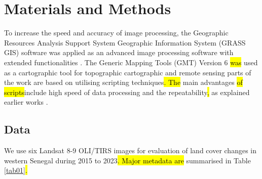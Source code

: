 \documentclass[earth,article,submit,pdftex,moreauthors]{Definitions/mdpi}
\begin{document}
\section{Materials and Methods}

To increase the speed and accuracy of image processing, the Geographic Resources Analysis Support System Geographic Information System (GRASS GIS) software was applied as an advanced image processing software with extended functionalities \cite{Neteleretal2008}. The Generic Mapping Tools (GMT) Version 6 \cite{Wessel} \hl{was} used as a cartographic tool for topographic \hl{ }cartographic and remote sensing parts of the work are based on utilising scripting techniques\hl{. The }main advantages \hl{of scripts}include\hl{ }high speed of data processing and the repeatability\hl{, }as explained earlier works \cite{min13050604,Lemenkova202213,Lemenkova202206}.

\subsection{Data}

We use six Landsat 8-9 OLI/TIRS images for evaluation of land cover changes in western Senegal during 2015 to 2023\hl{. Major metadata are }summarised in Table \ref{tab01}\hl{.} 
\end{document}
